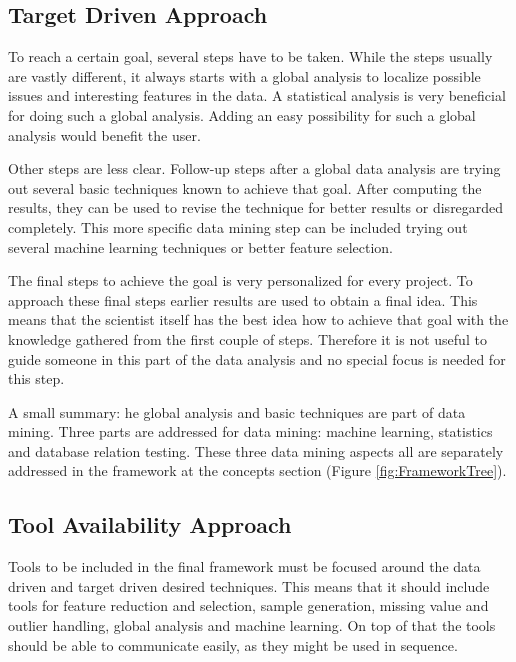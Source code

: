 \documentclass[10pt,a4paper]{article}
\begin{document}
	\subsection{Target Driven Approach}
	\label{subsec:TargetDrivenApproach}
	
	To reach a certain goal, several steps have to be taken. While the steps usually are vastly different, it always starts with a global analysis to localize possible issues and interesting features in the data. A statistical analysis is very beneficial for doing such a global analysis. Adding an easy possibility for such a global analysis would benefit the user.
	
	Other steps are less clear. Follow-up steps after a global data analysis are trying out several basic techniques known to achieve that goal. After computing the results, they can be used to revise the technique for better results or disregarded completely. This more specific data mining step can be included trying out several machine learning techniques or better feature selection.
	
	The final steps to achieve the goal is very personalized for every project. To approach these final steps earlier results are used to obtain a final idea. This means that the scientist itself has the best idea how to achieve that goal with the knowledge gathered from the first couple of steps. Therefore it is not useful to guide someone in this part of the data analysis and no special focus is needed for this step.
	
	A small summary: he global analysis and basic techniques are part of data mining. Three parts are addressed for data mining: machine learning, statistics and database relation testing. These three data mining aspects all are separately addressed in the framework at the concepts section (Figure \ref{fig:FrameworkTree}).
		
	\subsection{Tool Availability Approach}
	\label{subsec:ToolAvailabilityDrivenApproach}
	
	Tools to be included in the final framework must be focused around the data driven and target driven desired techniques. This means that it should include tools for feature reduction and selection, sample generation, missing value and outlier handling, global analysis and machine learning. On top of that the tools should be able to communicate easily, as they might be used in sequence.
	
\end{document}
